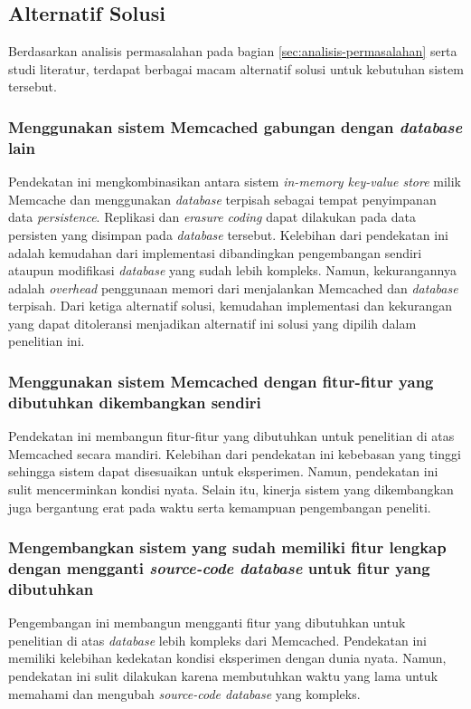 \subsection{Alternatif Solusi}
\label{sec:alternatif-solusi}

Berdasarkan analisis permasalahan pada bagian \ref{sec:analisis-permasalahan} serta studi literatur, terdapat berbagai macam alternatif solusi untuk kebutuhan sistem tersebut.

\subsubsection{Menggunakan sistem Memcached gabungan dengan \textit{database} lain}
Pendekatan ini mengkombinasikan antara sistem \textit{in-memory key-value store} milik Memcache dan menggunakan \textit{database} terpisah sebagai tempat penyimpanan data \textit{persistence}. Replikasi dan \textit{erasure coding} dapat dilakukan pada data persisten yang disimpan pada \textit{database} tersebut. Kelebihan dari pendekatan ini adalah kemudahan dari implementasi dibandingkan pengembangan sendiri ataupun modifikasi \textit{database} yang sudah lebih kompleks. Namun, kekurangannya adalah \textit{overhead} penggunaan memori dari menjalankan Memcached dan \textit{database} terpisah. Dari ketiga alternatif solusi, kemudahan implementasi dan kekurangan yang dapat ditoleransi menjadikan alternatif ini solusi yang dipilih dalam penelitian ini.

\subsubsection{Menggunakan sistem Memcached dengan fitur-fitur yang dibutuhkan dikembangkan sendiri}
Pendekatan ini membangun fitur-fitur yang dibutuhkan untuk penelitian di atas Memcached secara mandiri. Kelebihan dari pendekatan ini kebebasan yang tinggi sehingga sistem dapat disesuaikan untuk eksperimen. Namun, pendekatan ini sulit mencerminkan kondisi nyata. Selain itu, kinerja sistem yang dikembangkan juga bergantung erat pada waktu serta kemampuan pengembangan peneliti.

\subsubsection{Mengembangkan sistem yang sudah memiliki fitur lengkap dengan mengganti \textit{source-code database} untuk fitur yang dibutuhkan}
Pengembangan ini membangun mengganti fitur yang dibutuhkan untuk penelitian di atas \textit{database} lebih kompleks dari Memcached. Pendekatan ini memiliki kelebihan kedekatan kondisi eksperimen dengan dunia nyata. Namun, pendekatan ini sulit dilakukan karena membutuhkan waktu yang lama untuk memahami dan mengubah \textit{source-code database} yang kompleks.
